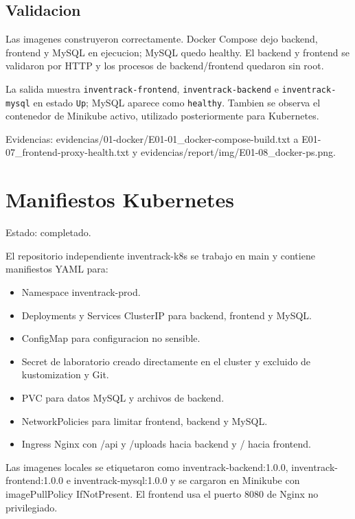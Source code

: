 \subsection{Validacion}\label{validacion}

Las imagenes construyeron correctamente. Docker Compose dejo backend, frontend y MySQL en ejecucion; MySQL quedo healthy. El backend y frontend se validaron por HTTP y los procesos de backend/frontend quedaron sin root.

La salida muestra \texttt{inventrack-frontend}, \texttt{inventrack-backend} e \texttt{inventrack-mysql} en estado \texttt{Up}; MySQL aparece como \texttt{healthy}. Tambien se observa el contenedor de Minikube activo, utilizado posteriormente para Kubernetes.

Evidencias: evidencias/01-docker/E01-01\_docker-compose-build.txt a E01-07\_frontend-proxy-health.txt y evidencias/report/img/E01-08\_docker-ps.png.

\section{Manifiestos Kubernetes}\label{manifiestos-kubernetes}

Estado: completado.

El repositorio independiente inventrack-k8s se trabajo en main y contiene manifiestos YAML para:

\begin{itemize}
\tightlist
\item
  Namespace inventrack-prod.
\item
  Deployments y Services ClusterIP para backend, frontend y MySQL.
\item
  ConfigMap para configuracion no sensible.
\item
  Secret de laboratorio creado directamente en el cluster y excluido de kustomization y Git.
\item
  PVC para datos MySQL y archivos de backend.
\item
  NetworkPolicies para limitar frontend, backend y MySQL.
\item
  Ingress Nginx con /api y /uploads hacia backend y / hacia frontend.
\end{itemize}

Las imagenes locales se etiquetaron como inventrack-backend:1.0.0, inventrack-frontend:1.0.0 e inventrack-mysql:1.0.0 y se cargaron en Minikube con imagePullPolicy IfNotPresent. El frontend usa el puerto 8080 de Nginx no privilegiado.

